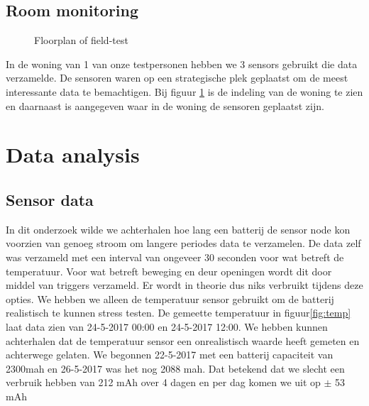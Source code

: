 \documentclass{below-ext}
\begin{document}
\subsection{Room monitoring}
\begin{figure}
\label{fig:floorplan}
\caption{Floorplan of field-test}
\end{figure}
In de woning van 1 van onze testpersonen hebben we 3 sensors gebruikt die data verzamelde. De sensoren waren op een strategische plek geplaatst om de meest interessante data te bemachtigen. Bij figuur \ref{fig:floorplan} is de indeling van de woning te zien en daarnaast is aangegeven waar in de woning de sensoren geplaatst zijn.

\section{Data analysis}
\subsection{Sensor data}
In dit onderzoek wilde we achterhalen hoe lang een batterij de sensor node kon voorzien van genoeg stroom om langere periodes data te verzamelen. De data zelf was verzameld met een interval van ongeveer 30 seconden voor wat betreft de temperatuur. Voor wat betreft beweging en deur openingen wordt dit door middel van triggers verzameld. Er wordt in theorie dus niks verbruikt tijdens deze opties. We hebben we alleen de temperatuur sensor gebruikt om de batterij realistisch te kunnen stress testen. De gemeette temperatuur in figuur\ref{fig:temp} laat data zien van  24-5-2017 00:00 en 24-5-2017 12:00.
We hebben kunnen achterhalen dat de temperatuur sensor een onrealistisch waarde heeft gemeten en achterwege gelaten. We begonnen 22-5-2017 met een batterij capaciteit van 2300mah en 26-5-2017 was het nog 2088 mah. Dat betekend dat we slecht een verbruik hebben van 212 mAh over 4 dagen en per dag komen we uit op $\pm$ 53 mAh 
\end{document}
